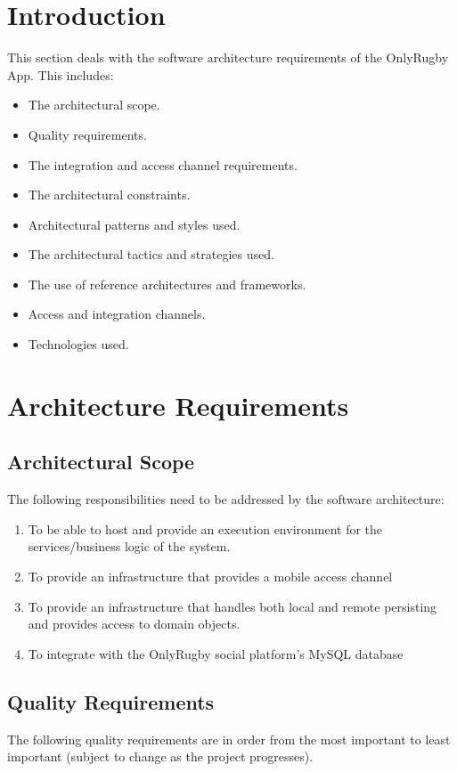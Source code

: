 \documentclass[hidelinks,a4paper,12pt]{article}
\begin{document}
\newpage
\section{Introduction} This section deals with the software architecture requirements of the OnlyRugby App. This includes:
	\begin{itemize} 
		\item The architectural scope.
		\item Quality requirements.
		\item The integration and access channel requirements.
		\item The architectural constraints.
		\item Architectural patterns and styles used.
		\item The architectural tactics and strategies used.
		\item The use of reference architectures and frameworks.
		\item Access and integration channels.
		\item Technologies used.
	\end{itemize}

\section{Architecture Requirements}
	\subsection{Architectural Scope}
	The following responsibilities need to be addressed by the software architecture:
	\begin{enumerate}
		\item To be able to host and provide an execution environment for the services/business logic of the system.
		\item To provide an infrastructure that provides a mobile access channel
		\item To provide an infrastructure that handles both local and remote persisting and provides access to domain objects.
		\item To integrate with the OnlyRugby social platform's MySQL database
	\end{enumerate}
\newpage
\subsection{Quality Requirements}
	The following quality requirements are in order from the most important to least important (subject to change as the project progresses).	
\end{document}
